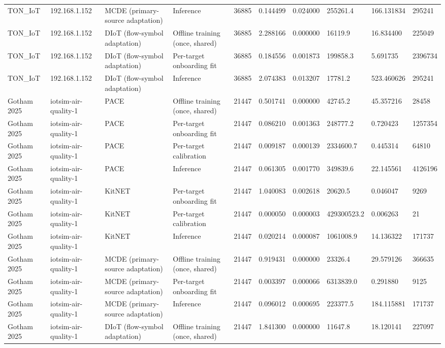\begin{tabular}{llllllllll}
TON\_IoT & 192.168.1.152 & MCDE (primary-source adaptation) & Inference & 36885 & 0.144499 & 0.024000 & 255261.4 & 166.131834 & 295241 \\
TON\_IoT & 192.168.1.152 & DIoT (flow-symbol adaptation) & Offline training (once, shared) & 36885 & 2.288166 & 0.000000 & 16119.9 & 16.834400 & 225049 \\
TON\_IoT & 192.168.1.152 & DIoT (flow-symbol adaptation) & Per-target onboarding fit & 36885 & 0.184556 & 0.001873 & 199858.3 & 5.691735 & 2396734 \\
TON\_IoT & 192.168.1.152 & DIoT (flow-symbol adaptation) & Inference & 36885 & 2.074383 & 0.013207 & 17781.2 & 523.460626 & 295241 \\
Gotham 2025 & iotsim-air-quality-1 & PACE & Offline training (once, shared) & 21447 & 0.501741 & 0.000000 & 42745.2 & 45.357216 & 28458 \\
Gotham 2025 & iotsim-air-quality-1 & PACE & Per-target onboarding fit & 21447 & 0.086210 & 0.001363 & 248777.2 & 0.720423 & 1257354 \\
Gotham 2025 & iotsim-air-quality-1 & PACE & Per-target calibration & 21447 & 0.009187 & 0.000139 & 2334600.7 & 0.445314 & 64810 \\
Gotham 2025 & iotsim-air-quality-1 & PACE & Inference & 21447 & 0.061305 & 0.001770 & 349839.6 & 22.145561 & 4126196 \\
Gotham 2025 & iotsim-air-quality-1 & KitNET & Per-target onboarding fit & 21447 & 1.040083 & 0.002618 & 20620.5 & 0.046047 & 9269 \\
Gotham 2025 & iotsim-air-quality-1 & KitNET & Per-target calibration & 21447 & 0.000050 & 0.000003 & 429300523.2 & 0.006263 & 21 \\
Gotham 2025 & iotsim-air-quality-1 & KitNET & Inference & 21447 & 0.020214 & 0.000087 & 1061008.9 & 14.136322 & 171737 \\
Gotham 2025 & iotsim-air-quality-1 & MCDE (primary-source adaptation) & Offline training (once, shared) & 21447 & 0.919431 & 0.000000 & 23326.4 & 29.579126 & 366635 \\
Gotham 2025 & iotsim-air-quality-1 & MCDE (primary-source adaptation) & Per-target onboarding fit & 21447 & 0.003397 & 0.000066 & 6313839.0 & 0.291880 & 9125 \\
Gotham 2025 & iotsim-air-quality-1 & MCDE (primary-source adaptation) & Inference & 21447 & 0.096012 & 0.000695 & 223377.5 & 184.115881 & 171737 \\
Gotham 2025 & iotsim-air-quality-1 & DIoT (flow-symbol adaptation) & Offline training (once, shared) & 21447 & 1.841300 & 0.000000 & 11647.8 & 18.120141 & 227097 \\

\end{tabular}
